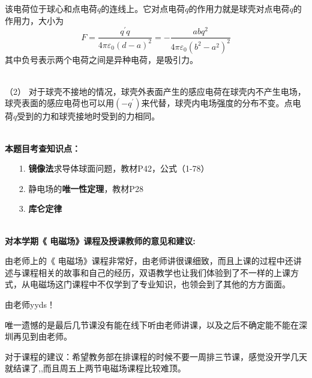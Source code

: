 \documentclass[a4paper,12pt]{article}
\begin{document}
\noindent 该电荷位于球心和点电荷$q$的连线上。它对点电荷$q$的作用力就是球壳对点电荷$q$的作用力，大小为
$$
F=\frac{q^{\prime}q}{4\pi \varepsilon _0\left( d-a \right) ^2}=-\frac{abq^2}{4\pi \varepsilon _0\left( b^2-a^2 \right) ^2}
$$
\noindent 其中负号表示两个电荷之间是异种电荷，是吸引力。

~\\
\noindent（2） 对于球壳不接地的情况，球壳外表面产生的感应电荷在球壳内不产生电场，球壳表面的感应电荷也可以用$(-q^{'})$来代替，球壳内电场强度的分布不变。点电荷$q$受到的力和球壳接地时受到的力相同。

~\\
\noindent \textbf{本题目考查知识点：}
\begin{enumerate}
	\item[1.] \textbf{镜像法}求导体球面问题，教材P42，公式（1-78）
	\item[2.] 静电场的\textbf{唯一性定理}，教材P28
	\item[3.] \textbf{库仑定律}	
\end{enumerate}

~\\


\noindent \textbf{对本学期《 电磁场》课程及授课教师的意见和建议:}

由老师上的《 电磁场》课程非常好，由老师讲很课细致，而且上课的过程中还讲述与课程相关的故事和自己的经历，双语教学也让我们体验到了不一样的上课方式，从电磁场这门课程中不仅学到了专业知识，也领会到了其他的方方面面。

由老师yyds！

唯一遗憾的是最后几节课没有能在线下听由老师讲课，以及之后不确定能不能在深圳再见到由老师。

对于课程的建议：希望教务部在排课程的时候不要一周排三节课，感觉没开学几天就结课了,,而且周五上两节电磁场课程比较难顶。
	
\end{document}
